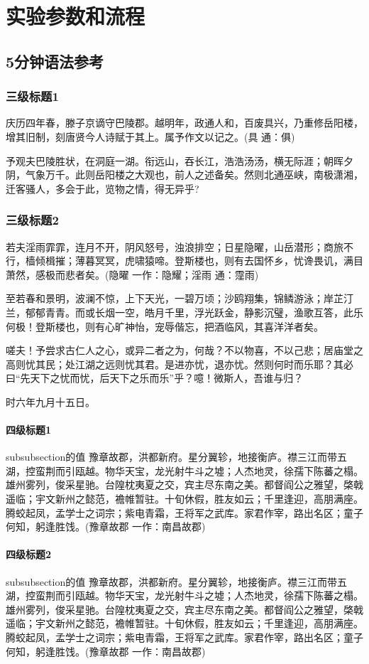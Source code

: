 \chapter{实验参数和流程}
\section{5分钟语法参考}
\subsection{三级标题1}
庆历四年春，滕子京谪守巴陵郡。越明年，政通人和，百废具兴，乃重修岳阳楼，增其旧制，刻唐贤今人诗赋于其上。属予作文以记之。(具 通：俱)

予观夫巴陵胜状，在洞庭一湖。衔远山，吞长江，浩浩汤汤，横无际涯；朝晖夕阴，气象万千。此则岳阳楼之大观也，前人之述备矣。然则北通巫峡，南极潇湘，迁客骚人，多会于此，览物之情，得无异乎?
\subsection{三级标题2}

若夫淫雨霏霏，连月不开，阴风怒号，浊浪排空；日星隐曜，山岳潜形；商旅不行，樯倾楫摧；薄暮冥冥，虎啸猿啼。登斯楼也，则有去国怀乡，忧谗畏讥，满目萧然，感极而悲者矣。(隐曜 一作：隐耀；淫雨 通：霪雨)

至若春和景明，波澜不惊，上下天光，一碧万顷；沙鸥翔集，锦鳞游泳；岸芷汀兰，郁郁青青。而或长烟一空，皓月千里，浮光跃金，静影沉璧，渔歌互答，此乐何极！登斯楼也，则有心旷神怡，宠辱偕忘，把酒临风，其喜洋洋者矣。

嗟夫！予尝求古仁人之心，或异二者之为，何哉？不以物喜，不以己悲；居庙堂之高则忧其民；处江湖之远则忧其君。是进亦忧，退亦忧。然则何时而乐耶？其必曰“先天下之忧而忧，后天下之乐而乐”乎？噫！微斯人，吾谁与归？

时六年九月十五日。
\subsubsection{四级标题1}
subsubsection的值
豫章故郡，洪都新府。星分翼轸，地接衡庐。襟三江而带五湖，控蛮荆而引瓯越。物华天宝，龙光射牛斗之墟；人杰地灵，徐孺下陈蕃之榻。雄州雾列，俊采星驰。台隍枕夷夏之交，宾主尽东南之美。都督阎公之雅望，棨戟遥临；宇文新州之懿范，襜帷暂驻。十旬休假，胜友如云；千里逢迎，高朋满座。腾蛟起凤，孟学士之词宗；紫电青霜，王将军之武库。家君作宰，路出名区；童子何知，躬逢胜饯。(豫章故郡 一作：南昌故郡)
\subsubsection{四级标题2}
subsubsection的值
豫章故郡，洪都新府。星分翼轸，地接衡庐。襟三江而带五湖，控蛮荆而引瓯越。物华天宝，龙光射牛斗之墟；人杰地灵，徐孺下陈蕃之榻。雄州雾列，俊采星驰。台隍枕夷夏之交，宾主尽东南之美。都督阎公之雅望，棨戟遥临；宇文新州之懿范，襜帷暂驻。十旬休假，胜友如云；千里逢迎，高朋满座。腾蛟起凤，孟学士之词宗；紫电青霜，王将军之武库。家君作宰，路出名区；童子何知，躬逢胜饯。(豫章故郡 一作：南昌故郡)
